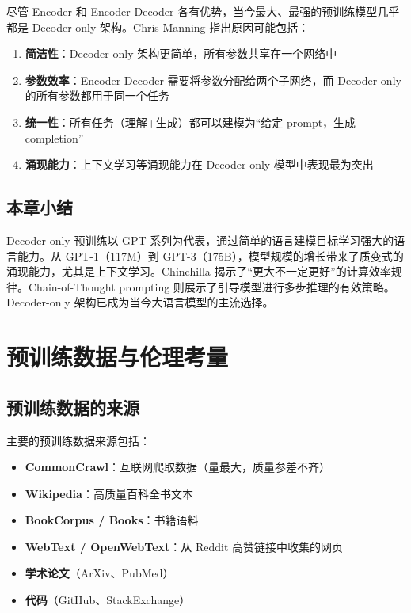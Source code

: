 \documentclass[a4paper]{article}
\begin{document}
尽管 Encoder 和 Encoder-Decoder 各有优势，当今最大、最强的预训练模型几乎都是 Decoder-only 架构。Chris Manning 指出原因可能包括：

\begin{enumerate}
    \item \textbf{简洁性}：Decoder-only 架构更简单，所有参数共享在一个网络中
    \item \textbf{参数效率}：Encoder-Decoder 需要将参数分配给两个子网络，而 Decoder-only 的所有参数都用于同一个任务
    \item \textbf{统一性}：所有任务（理解+生成）都可以建模为``给定 prompt，生成 completion''
    \item \textbf{涌现能力}：上下文学习等涌现能力在 Decoder-only 模型中表现最为突出
\end{enumerate}

\subsection{本章小结}

Decoder-only 预训练以 GPT 系列为代表，通过简单的语言建模目标学习强大的语言能力。从 GPT-1（117M）到 GPT-3（175B），模型规模的增长带来了质变式的涌现能力，尤其是上下文学习。Chinchilla 揭示了``更大不一定更好''的计算效率规律。Chain-of-Thought prompting 则展示了引导模型进行多步推理的有效策略。Decoder-only 架构已成为当今大语言模型的主流选择。


\section{预训练数据与伦理考量}

\subsection{预训练数据的来源}





主要的预训练数据来源包括：

\begin{itemize}
    \item \textbf{CommonCrawl}：互联网爬取数据（量最大，质量参差不齐）
    \item \textbf{Wikipedia}：高质量百科全书文本
    \item \textbf{BookCorpus / Books}：书籍语料
    \item \textbf{WebText / OpenWebText}：从 Reddit 高赞链接中收集的网页
    \item \textbf{学术论文}（ArXiv、PubMed）
    \item \textbf{代码}（GitHub、StackExchange）
\end{itemize}
\end{document}
